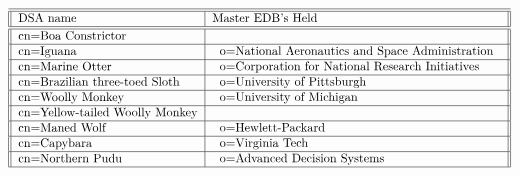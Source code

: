 \begin{table}
\caption{DSAs at the c=US Level}
\small
\[
\begin{tabular}{||l|l||} \hline\hline
DSA name 		& Master EDB's Held \\ \hline\hline	
cn=Boa Constrictor
           &\begin{tabular}{l}
           \end{tabular}\\ \hline
cn=Iguana
           &\begin{tabular}{l}
           o=National Aeronautics and Space Administration \\
           \end{tabular}\\ \hline
cn=Marine Otter
           &\begin{tabular}{l}
           o=Corporation for National Research Initiatives \\
           \end{tabular}\\ \hline
cn=Brazilian three-toed Sloth
           &\begin{tabular}{l}
           o=University of Pittsburgh \\
           \end{tabular}\\ \hline
cn=Woolly Monkey
           &\begin{tabular}{l}
           o=University of Michigan \\
           \end{tabular}\\ \hline
cn=Yellow-tailed Woolly Monkey
           &\begin{tabular}{l}
           \end{tabular}\\ \hline
cn=Maned Wolf
           &\begin{tabular}{l}
           o=Hewlett-Packard \\
           \end{tabular}\\ \hline
cn=Capybara
           &\begin{tabular}{l}
           o=Virginia Tech \\
           \end{tabular}\\ \hline
cn=Northern Pudu
           &\begin{tabular}{l}
           o=Advanced Decision Systems \\
           \end{tabular}\\ \hline

\end{tabular}\]
\end{table}
